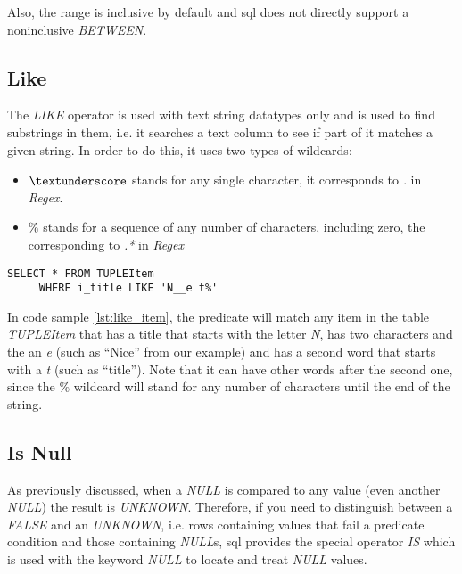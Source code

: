 Also, the range is inclusive by default and \ac{sql} does not directly support a noninclusive \emph{BETWEEN}.  

\subsection{Like}

The \emph{LIKE} operator is used with text string datatypes only and is used to find substrings in them, i.e. it searches a text column to see if part of it matches a given string. In order to do this, it uses two types of wildcards:

\begin{itemize}
	\item $\textunderscore$ stands for any single character, it corresponds to \emph{.} in \emph{Regex}.
	\item $\%$ stands for a sequence of any number of characters, including zero, the corresponding to \emph{.*} in \emph{Regex}
\end{itemize} 

\lstset{
  language=SQL, 
  caption=SQL like operator, 
  label=lst:like_item,
}

\begin{shaded}
\begin{lstlisting}
SELECT * FROM TUPLEItem
     WHERE i_title LIKE 'N__e t%' 
\end{lstlisting}  
\end{shaded}

In code sample \ref{lst:like_item}, the predicate will match any item in the table \emph{TUPLEItem} that has a title that starts with the letter \emph{N}, has two characters and the an \emph{e} (such as ``Nice'' from our example) and has a second word that starts with a \emph{t} (such as ``title''). Note that it can have other words after the second one, since the $\%$ wildcard will stand for any number of characters until the end of the string.

\subsection{Is Null}
As previously discussed, when a \emph{NULL} is compared to any value (even another \emph{NULL}) the result is \emph{UNKNOWN}. Therefore, if you need to distinguish between a \emph{FALSE} and an \emph{UNKNOWN}, i.e. rows containing values that fail a predicate condition and those containing \emph{NULL}s, \ac{sql} provides the special operator \emph{IS} which is used with the keyword \emph{NULL} to locate and treat \emph{NULL} values.

